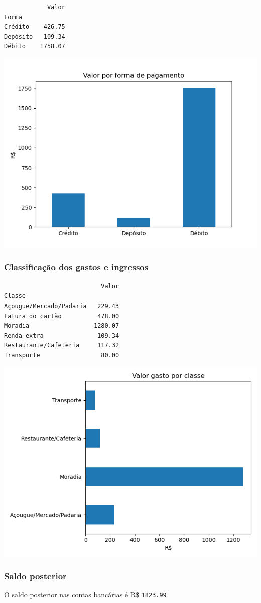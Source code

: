 \documentclass[11pt]{article}
\begin{document}
\begin{verbatim}
            Valor
Forma            
Crédito    426.75
Depósito   109.34
Débito    1758.07
\end{verbatim}


\begin{center}
\includegraphics[width=.9\linewidth]{outubro-forma.png}
\end{center}

\subsubsection{Classificação dos gastos e ingressos}
\label{sec:org1787f36}

\begin{verbatim}
                           Valor
Classe                          
Açougue/Mercado/Padaria   229.43
Fatura do cartão          478.00
Moradia                  1280.07
Renda extra               109.34
Restaurante/Cafeteria     117.32
Transporte                 80.00
\end{verbatim}


\begin{center}
\includegraphics[width=.9\linewidth]{outubro-classe.png}
\end{center}

\subsubsection{Saldo posterior}
\label{sec:org9d452a1}

O saldo posterior nas contas bancárias é R\$ \texttt{1823.99}
\end{document}
